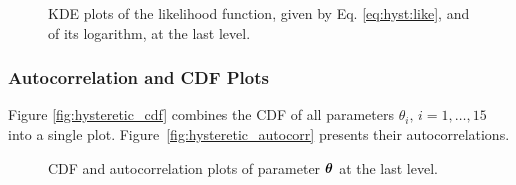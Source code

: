 \begin{figure}[hptb]
\centering
{}
\vspace{-8pt}
\caption{KDE plots of the likelihood function, given by Eq. \eqref{eq:hyst:like}, and of its logarithm, at the last level.}
\label{fig:hysteretic_kde_like}
\end{figure}


\subsubsection{Autocorrelation and CDF Plots}

Figure \ref{fig:hysteretic_cdf} combines the CDF of all parameters $\theta_i,\, i=1,\ldots,15$ into a single plot. 
Figure~\ref{fig:hysteretic_autocorr} presents their autocorrelations.

\begin{figure}[hptb]
\centering
\hspace{-10pt}
\vspace{-8pt}
\caption{CDF and autocorrelation plots of parameter $\mbox{\boldmath$ \theta $}$ at the last level.}
\end{figure}

